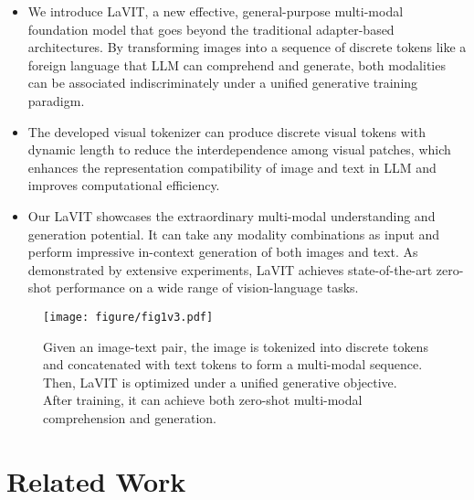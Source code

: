\begin{itemize}[leftmargin=*]
\item We introduce LaVIT, a new effective, general-purpose multi-modal foundation model that goes beyond the traditional adapter-based architectures. By transforming images into a sequence of discrete tokens like a foreign language that LLM can comprehend and generate, both modalities can be associated indiscriminately under a unified generative training paradigm. 

\item The developed visual tokenizer can produce discrete visual tokens with dynamic length to reduce the interdependence among visual patches, which enhances the representation compatibility of image and text in LLM and improves computational efficiency. 

\item Our LaVIT showcases the extraordinary multi-modal understanding and generation potential. It can take any modality combinations as input and perform impressive in-context generation of both images and text. As demonstrated by extensive experiments, LaVIT achieves state-of-the-art zero-shot performance on a wide range of vision-language tasks.

\end{itemize}

\begin{figure}[t]
\begin{center}
\texttt{[image: figure/fig1v3.pdf]}
\end{center}
\vspace{-0.1in}
\caption{Given an image-text pair, the image is tokenized into discrete tokens and concatenated with text tokens to form a multi-modal sequence. Then, LaVIT is optimized under a unified generative objective. After training, it can achieve both zero-shot multi-modal comprehension and generation.}
\label{fig:fig1}
\vspace{-0.15in}
\end{figure}

\vspace{-0.1in}

\section{Related Work}

